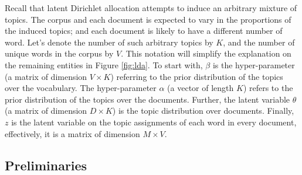 \documentclass{mprop}
\begin{document}
Recall that latent Dirichlet allocation attempts to induce an arbitrary mixture of topics. The corpus and each document is expected to vary in the proportions of the induced topics; and each document is likely to have a different number of word. Let's denote the number of such arbitrary topics by $K$, and the number of unique words in the corpus by $V$. This notation will simplify the explanation on the remaining entities in Figure \ref{fig:lda}. To start with, $\beta$ is the hyper-parameter (a matrix of dimension $V \times K$) referring to the prior distribution of the topics over the vocabulary. The hyper-parameter $\alpha$ (a vector of length $K$) refers to the prior distribution of the topics over the documents. Further, the latent variable $\theta$ (a matrix of dimension $D \times K$) is the topic distribution over documents. Finally, $z$ is the latent variable on the topic assignments of each word in every document, effectively, it is a matrix of dimension $M \times V$.

\subsection{Preliminaries}
\end{document}
